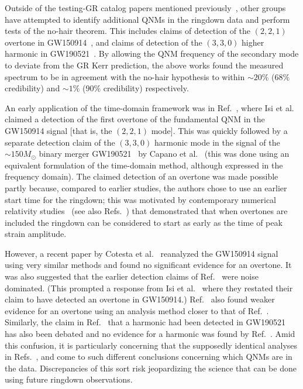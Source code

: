 Outside of the testing-GR catalog papers mentioned previously~\cite{LIGOScientific:2020tif, LIGOScientific:2021sio}, other groups have attempted to identify additional QNMs in the ringdown data and perform tests of the no-hair theorem. 
This includes claims of detection of the $(2,2,1)$ overtone in GW150914~\cite{Isi:2019aib}, and claims of detection of the $(3,3,0)$ higher harmonic in GW190521~\cite{Capano:2021etf}. 
By allowing the QNM frequency of the secondary mode to deviate from the GR Kerr prediction, the above works found the measured spectrum to be in agreement with the no-hair hypothesis to within $\sim 20\%$ ($68\%$ credibility) and $\sim 1\%$ ($90\%$ credibility) respectively.

An early application of the time-domain framework was in Ref.~\cite{Isi:2019aib}, where Isi et al. claimed a detection of the first overtone of the fundamental QNM in the GW150914 signal [that is, the $(2, 2, 1)$ mode]. 
This was quickly followed by a separate detection claim of the $(3,3,0)$ harmonic mode in the signal of the $\sim 150M_\odot$ binary merger GW190521~\cite{LIGOScientific:2020iuh} by Capano et al.~\cite{Capano:2021etf} (this was done using an equivalent formulation of the time-domain method, although expressed in the frequency domain).
The claimed detection of an overtone was made possible partly because, compared to earlier studies, the authors chose to use an earlier start time for the ringdown; this was motivated by contemporary numerical relativity studies~\cite{Giesler:2019uxc} (see also Refs.~\cite{Bhagwat:2019dtm, Ota:2019bzl, Cook:2020otn, JimenezForteza:2020cve, Dhani:2020nik, Finch:2021iip, Forteza:2021wfq, Dhani:2021vac, MaganaZertuche:2021syq}) that demonstrated that when overtones are included the ringdown can be considered to start as early as the time of peak strain amplitude. 

However, a recent paper by Cotesta et al.~\cite{Cotesta:2022pci} reanalyzed the GW150914 signal using very similar methods and found no significant evidence for an overtone.
It was also suggested that the earlier detection claims of Ref.~\cite{Isi:2019aib} were noise dominated.
(This prompted a response from Isi et al.~\cite{Isi:2022mhy} where they restated their claim to have detected an overtone in GW150914.) 
Ref.~\cite{Bustillo:2020buq} also found weaker evidence for an overtone using an analysis method closer to that of Ref.~\cite{LIGOScientific:2016lio}.
Similarly, the claim in Ref.~\cite{Capano:2021etf} that a harmonic had been detected in GW190521 has also been debated and no evidence for a harmonic was found by Ref.~\cite{LIGOScientific:2021sio}.
Amid this confusion, it is particularly concerning that the supposedly identical analyses in Refs.~\cite{Isi:2019aib, Isi:2022mhy}, and \cite{Cotesta:2022pci} come to such different conclusions concerning which QNMs are in the data. 
Discrepancies of this sort risk jeopardizing the science that can be done using future ringdown observations.

